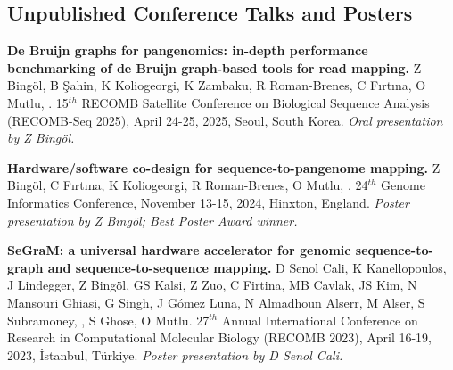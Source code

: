 

    


\vspace{-.4cm}
\subsection{\small \sc  Unpublished Conference Talks and Posters}


\vspace{-.2cm}
{\bf De Bruijn graphs for pangenomics: in-depth performance benchmarking of de Bruijn graph-based tools for read mapping.} Z Bingöl, B Şahin, K Koliogeorgi, K Zambaku, R Roman-Brenes,  C Fırtına, O Mutlu, \calkan{}. 15$^{th}$ RECOMB Satellite Conference on Biological Sequence Analysis (RECOMB-Seq 2025), April 24-25, 2025, Seoul, South Korea. \textit{Oral presentation by Z Bingöl.}


\vspace{-.2cm}
{\bf Hardware/software co-design for sequence-to-pangenome mapping.} Z Bingöl, C Fırtına, K Koliogeorgi, R Roman-Brenes, O Mutlu, \calkan{}. 24$^{th}$ Genome Informatics Conference, November 13-15, 2024, Hinxton, England. \textit{Poster presentation by Z Bingöl; Best Poster Award winner.}


\vspace{-.2cm}
{\bf SeGraM: a universal hardware accelerator for genomic sequence-to-graph and sequence-to-sequence mapping.} D Senol Cali, K Kanellopoulos, J Lindegger, Z Bingöl, GS Kalsi, Z Zuo, C Firtina, MB Cavlak, JS Kim, N Mansouri Ghiasi, G Singh, J Gómez Luna, N Almadhoun Alserr, M Alser, S Subramoney, \calkan{}, S Ghose, O Mutlu. 27$^{th}$ Annual International Conference on Research in Computational Molecular Biology (RECOMB 2023), April 16-19, 2023, İstanbul, Türkiye. {\it Poster presentation by D Senol Cali.}

